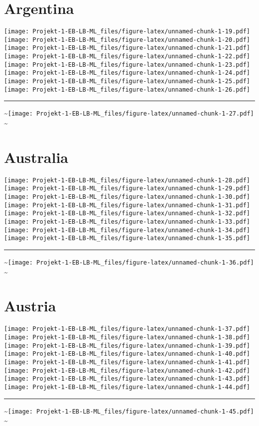 \documentclass[]{article}
\begin{document}
\section{Argentina}\label{argentina}

\texttt{[image: Projekt-1-EB-LB-ML\_files/figure-latex/unnamed-chunk-1-19.pdf]}
\texttt{[image: Projekt-1-EB-LB-ML\_files/figure-latex/unnamed-chunk-1-20.pdf]}
\texttt{[image: Projekt-1-EB-LB-ML\_files/figure-latex/unnamed-chunk-1-21.pdf]}
\texttt{[image: Projekt-1-EB-LB-ML\_files/figure-latex/unnamed-chunk-1-22.pdf]}
\texttt{[image: Projekt-1-EB-LB-ML\_files/figure-latex/unnamed-chunk-1-23.pdf]}
\texttt{[image: Projekt-1-EB-LB-ML\_files/figure-latex/unnamed-chunk-1-24.pdf]}
\texttt{[image: Projekt-1-EB-LB-ML\_files/figure-latex/unnamed-chunk-1-25.pdf]}
\texttt{[image: Projekt-1-EB-LB-ML\_files/figure-latex/unnamed-chunk-1-26.pdf]}
\bigskip\hrule\bigskip
\textasciitilde{}\hfill\texttt{[image: Projekt-1-EB-LB-ML\_files/figure-latex/unnamed-chunk-1-27.pdf]}
\hfill \textasciitilde{} \vfill\eject

\section{Australia}\label{australia}

\texttt{[image: Projekt-1-EB-LB-ML\_files/figure-latex/unnamed-chunk-1-28.pdf]}
\texttt{[image: Projekt-1-EB-LB-ML\_files/figure-latex/unnamed-chunk-1-29.pdf]}
\texttt{[image: Projekt-1-EB-LB-ML\_files/figure-latex/unnamed-chunk-1-30.pdf]}
\texttt{[image: Projekt-1-EB-LB-ML\_files/figure-latex/unnamed-chunk-1-31.pdf]}
\texttt{[image: Projekt-1-EB-LB-ML\_files/figure-latex/unnamed-chunk-1-32.pdf]}
\texttt{[image: Projekt-1-EB-LB-ML\_files/figure-latex/unnamed-chunk-1-33.pdf]}
\texttt{[image: Projekt-1-EB-LB-ML\_files/figure-latex/unnamed-chunk-1-34.pdf]}
\texttt{[image: Projekt-1-EB-LB-ML\_files/figure-latex/unnamed-chunk-1-35.pdf]}
\bigskip\hrule\bigskip
\textasciitilde{}\hfill\texttt{[image: Projekt-1-EB-LB-ML\_files/figure-latex/unnamed-chunk-1-36.pdf]}
\hfill \textasciitilde{} \vfill\eject

\section{Austria}\label{austria}

\texttt{[image: Projekt-1-EB-LB-ML\_files/figure-latex/unnamed-chunk-1-37.pdf]}
\texttt{[image: Projekt-1-EB-LB-ML\_files/figure-latex/unnamed-chunk-1-38.pdf]}
\texttt{[image: Projekt-1-EB-LB-ML\_files/figure-latex/unnamed-chunk-1-39.pdf]}
\texttt{[image: Projekt-1-EB-LB-ML\_files/figure-latex/unnamed-chunk-1-40.pdf]}
\texttt{[image: Projekt-1-EB-LB-ML\_files/figure-latex/unnamed-chunk-1-41.pdf]}
\texttt{[image: Projekt-1-EB-LB-ML\_files/figure-latex/unnamed-chunk-1-42.pdf]}
\texttt{[image: Projekt-1-EB-LB-ML\_files/figure-latex/unnamed-chunk-1-43.pdf]}
\texttt{[image: Projekt-1-EB-LB-ML\_files/figure-latex/unnamed-chunk-1-44.pdf]}
\bigskip\hrule\bigskip
\textasciitilde{}\hfill\texttt{[image: Projekt-1-EB-LB-ML\_files/figure-latex/unnamed-chunk-1-45.pdf]}
\hfill \textasciitilde{} \vfill\eject
\end{document}
